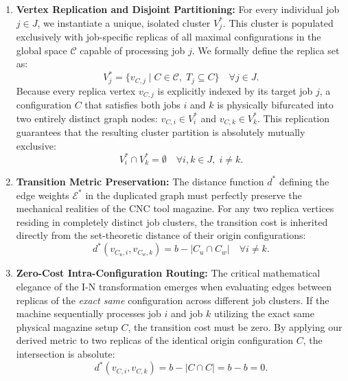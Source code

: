 \documentclass[11pt, a4paper]{book}
\begin{document}
	\begin{enumerate}
		\item \textbf{Vertex Replication and Disjoint Partitioning:} 
		For every individual job $j \in J$, we instantiate a unique, isolated cluster $V_j^*$. This cluster is populated exclusively with job-specific replicas of all maximal configurations in the global space $\mathcal{C}$ capable of processing job $j$. We formally define the replica set as:
		\begin{equation}
			V_j^* = \{ v_{C, j} \mid C \in \mathcal{C}, \; T_j \subseteq C \} \quad \forall j \in J.
		\end{equation}
		Because every replica vertex $v_{C,j}$ is explicitly indexed by its target job $j$, a configuration $C$ that satisfies both jobs $i$ and $k$ is physically bifurcated into two entirely distinct graph nodes: $v_{C,i} \in V_i^*$ and $v_{C,k} \in V_k^*$. This replication guarantees that the resulting cluster partition is absolutely mutually exclusive:
		\begin{equation}
			V_i^* \cap V_k^* = \emptyset \quad \forall i, k \in J, \; i \neq k.
		\end{equation}
		
		\item \textbf{Transition Metric Preservation:} 
		The distance function $d^*$ defining the edge weights $\mathcal{E}^*$ in the duplicated graph must perfectly preserve the mechanical realities of the CNC tool magazine. For any two replica vertices residing in completely distinct job clusters, the transition cost is inherited directly from the set-theoretic distance of their origin configurations:
		\begin{equation}
			d^*(v_{C_u, i}, v_{C_w, k}) = b - |C_u \cap C_w| \quad \forall i \neq k.
		\end{equation}
		
		\item \textbf{Zero-Cost Intra-Configuration Routing:}
		The critical mathematical elegance of the I-N transformation emerges when evaluating edges between replicas of the \textit{exact same} configuration across different job clusters. If the machine sequentially processes job $i$ and job $k$ utilizing the exact same physical magazine setup $C$, the transition cost must be zero. By applying our derived metric to two replicas of the identical origin configuration $C$, the intersection is absolute:
		\begin{equation}
			d^*(v_{C, i}, v_{C, k}) = b - |C \cap C| = b - b = 0.
		\end{equation}
	\end{enumerate}
	
\end{document}
